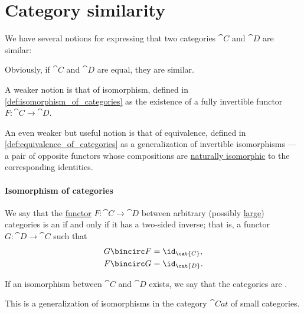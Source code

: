\section{Category similarity}\label{sec:category_similarity}

\begin{remark}\label{rem:category_similarity}
  We have several notions for expressing that two categories \( \cat{C} \) and \( \cat{D} \) are similar:

  \begin{thmenum}
     Obviously, if \( \cat{C} \) and \( \cat{D} \) are equal, they are similar.

     A weaker notion is that of isomorphism, defined in \cref{def:isomorphism_of_categories} as the existence of a fully invertible functor \( F: \cat{C} \to \cat{D} \).

     An even weaker but useful notion is that of equivalence, defined in \cref{def:equivalence_of_categories} as a generalization of invertible isomorphisms --- a pair of opposite functors whose compositions are \hyperref[def:natural_isomorphism]{naturally isomorphic} to the corresponding identities.
  \end{thmenum}
\end{remark}

\paragraph{Isomorphism of categories}

\begin{definition}\label{def:isomorphism_of_categories}\mimprovised
  We say that the \hyperref[def:functor]{functor} \( F: \cat{C} \to \cat{D} \) between arbitrary (possibly \hyperref[def:small_category]{large}) categories is an  if and only if it has a two-sided inverse; that is, a functor \( G: \cat{D} \to \cat{C} \) such that
  \begin{align*}
    G \bincirc F &= \id_{\cat{C}}, \\
    F \bincirc G &= \id_{\cat{D}}.
  \end{align*}

  If an isomorphism between \( \cat{C} \) and \( \cat{D} \) exists, we say that the categories are .
\end{definition}
\begin{comments}
  \item This is a generalization of isomorphisms in the category \hyperref[def:category_of_small_categories]{\( \cat{Cat} \)} of small categories.
\end{comments}

